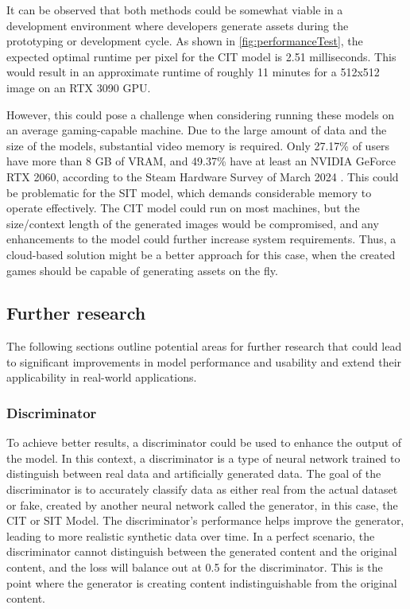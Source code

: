     It can be observed that both methods could be somewhat viable in a development environment where developers generate assets during the prototyping or development cycle. As shown in \autoref{fig:performanceTest}, the expected optimal runtime per pixel for the CIT model is 2.51 milliseconds. This would result in an approximate runtime of roughly 11 minutes for a 512x512 image on an RTX 3090 GPU.
    
    However, this could pose a challenge when considering running these models on an average gaming-capable machine. Due to the large amount of data and the size of the models, substantial video memory is required. Only 27.17\% of users have more than 8 GB of VRAM, and 49.37\% have at least an NVIDIA GeForce RTX 2060, according to the Steam Hardware Survey of March 2024 \autocite{Valve2024}. This could be problematic for the SIT model, which demands considerable memory to operate effectively. The CIT model could run on most machines, but the size/context length of the generated images would be compromised, and any enhancements to the model could further increase system requirements. Thus, a cloud-based solution might be a better approach for this case, when the created games should be capable of generating assets on the fly.
    

\subsection{Further research}

    The following sections outline potential areas for further research that could lead to significant improvements in model performance and usability and extend their applicability in real-world applications.

    \subsubsection{Discriminator}
    To achieve better results, a discriminator could be used to enhance the output of the model. In this context, a discriminator is a type of neural network trained to distinguish between real data and artificially generated data. The goal of the discriminator is to accurately classify data as either real from the actual dataset or fake, created by another neural network called the generator, in this case, the CIT or SIT Model. The discriminator's performance helps improve the generator, leading to more realistic synthetic data over time. In a perfect scenario, the discriminator cannot distinguish between the generated content and the original content, and the loss will balance out at 0.5 for the discriminator. This is the point where the generator is creating content indistinguishable from the original content.

